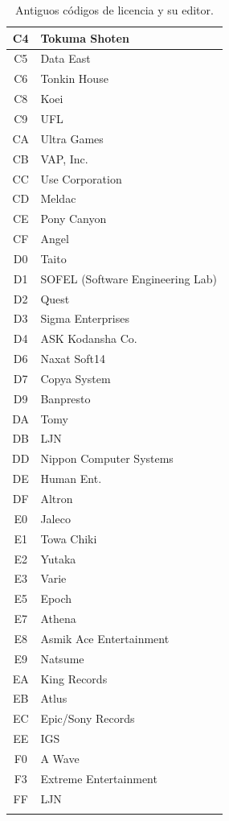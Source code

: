 \begin{longtable}{|c|l|}
C4 & Tokuma Shoten \\\hline
C5 & Data East \\\hline
C6 & Tonkin House \\\hline
C8 & Koei \\\hline
C9 & UFL \\\hline
CA & Ultra Games \\\hline
CB & VAP, Inc. \\\hline
CC & Use Corporation \\\hline
CD & Meldac \\\hline
CE & Pony Canyon \\\hline
CF & Angel \\\hline
D0 & Taito \\\hline
D1 & SOFEL (Software Engineering Lab) \\\hline
D2 & Quest \\\hline
D3 & Sigma Enterprises \\\hline
D4 & ASK Kodansha Co. \\\hline
D6 & Naxat Soft14 \\\hline
D7 & Copya System \\\hline
D9 & Banpresto \\\hline
DA & Tomy \\\hline
DB & LJN \\\hline
DD & Nippon Computer Systems \\\hline
DE & Human Ent. \\\hline
DF & Altron \\\hline
E0 & Jaleco \\\hline
E1 & Towa Chiki \\\hline
E2 & Yutaka \\\hline
E3 & Varie \\\hline
E5 & Epoch \\\hline
E7 & Athena \\\hline
E8 & Asmik Ace Entertainment \\\hline
E9 & Natsume \\\hline
EA & King Records \\\hline
EB & Atlus \\\hline
EC & Epic/Sony Records \\\hline
EE & IGS \\\hline
F0 & A Wave \\\hline
F3 & Extreme Entertainment \\\hline
FF & LJN \\\hline
\caption{Antiguos códigos de licencia y su editor.}
\end{longtable}

